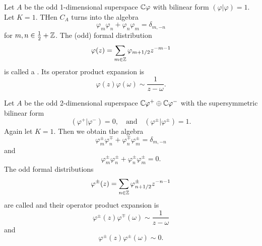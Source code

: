 Let $A$ be the odd 1-dimensional superspace $\mathbb{C}\varphi$ with bilinear
form $(\varphi|\varphi)=1$. Let $K=1$. THen $C_{A}$ turns into the
algebra
\begin{equation}
\varphi_{m}\varphi_{n}+\varphi_{n}\varphi_{m}=\delta_{m,-n}
\end{equation}
for $m,n\in\frac{1}{2}+\mathbb{Z}$. The (odd) formal distribution
\begin{equation}
\varphi(z)=\sum_{m\in\mathbb{Z}}\varphi_{m+1/2}z^{-m-1}
\end{equation}
is called a . Its operator product
expansion is
\begin{equation}
\varphi(z)\varphi(\omega)\sim\frac{1}{z-\omega}.
\end{equation}

Let $A$ be the odd 2-dimensional superspace
$\mathbb{C}\varphi^{+}\oplus\mathbb{C}\varphi^{-}$ with the supersymmetric bilinear
form
\begin{equation}
(\varphi^{+}|\varphi^{-})=0,\quad\mbox{and}\quad
(\varphi^{\pm}|\varphi^{\pm})=1.
\end{equation}
Again let $K=1$. Then we obtain the algebra
\begin{equation}
\varphi^{\pm}_{m}\varphi^{\mp}_{n}+\varphi^{\mp}_{n}\varphi^{\pm}_{m}=\delta_{m,-n}
\end{equation}
and
\begin{equation}
\varphi^{\pm}_{m}\varphi^{\pm}_{n}+\varphi^{\pm}_{n}\varphi^{\pm}_{m}=0.
\end{equation}
The odd formal distributions
\begin{equation}
\varphi^{\pm}(z)=\sum_{n\in\mathbb{Z}}\varphi^{\pm}_{n+1/2}z^{-n-1}
\end{equation}
are called  and their operator product
expansion is
\begin{equation}
\varphi^{\pm}(z)\varphi^{\mp}(\omega)\sim\frac{1}{z-\omega}
\end{equation}
and
\begin{equation}
\varphi^{\pm}(z)\varphi^{\pm}(\omega)\sim0.
\end{equation}
